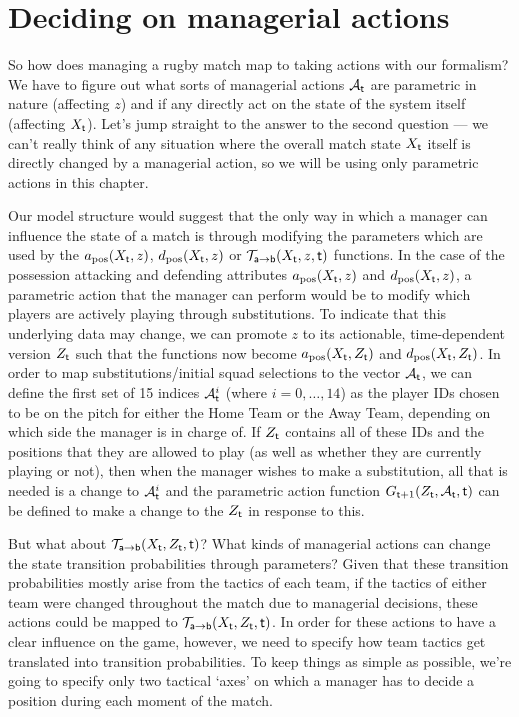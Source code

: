 \section{\sffamily Deciding on managerial actions}

So how does managing a rugby match map to taking actions with our formalism? We have to figure out what sorts of managerial actions ${\cal A}_{{\sf t}}$ are parametric in nature (affecting $z$) and if any directly act on the state of the system itself (affecting $X_{\sf t}$). Let's jump straight to the answer to the second question --- we can't really think of any situation where the overall match state $X_{\sf t}$ itself is directly changed by a managerial action, so we will be using only parametric actions in this chapter.

Our model structure would suggest that the only way in which a manager can influence the state of a match is through modifying the parameters which are used by the $a_{\rm pos}(X_{\sf t},z)$, $d_{\rm pos}(X_{\sf t},z)$ or ${\cal T}_{{\sf a}\rightarrow {\sf b}}(X_{\sf t},z,{\sf t})$ functions. In the case of the possession attacking and defending attributes $a_{\rm pos}(X_{\sf t},z)$ and $d_{\rm pos}(X_{\sf t},z)$, a parametric action that the manager can perform would be to modify which players are actively playing through substitutions. To indicate that this underlying data may change, we can promote $z$ to its actionable, time-dependent version $Z_{{\sf t}}$ such that the functions now become $a_{\rm pos}(X_{\sf t},Z_{\sf t})$ and $d_{\rm pos}(X_{\sf t},Z_{\sf t})$. In order to map substitutions/initial squad selections to the vector ${\cal A}_{\sf t}$, we can define the first set of 15 indices ${\cal A}_{\sf t}^i$ (where $i=0,\dots , 14$) as the player IDs chosen to be on the pitch for either the {\sf Home Team} or the {\sf Away Team}, depending on which side the manager is in charge of. If $Z_{\sf t}$ contains all of these IDs and the positions that they are allowed to play (as well as whether they are currently playing or not), then when the manager wishes to make a substitution, all that is needed is a change to ${\cal A}_{\sf t}^i$ and the parametric action function $G_{{\sf t}+1}(Z_{\sf t},{\cal A}_{\sf t},{\sf t})$ can be defined to make a change to the $Z_{\sf t}$ in response to this.

But what about ${\cal T}_{{\sf a}\rightarrow {\sf b}}(X_{\sf t},Z_{\sf t},{\sf t})$? What kinds of managerial actions can change the state transition probabilities through parameters? Given that these transition probabilities mostly arise from the tactics of each team, if the tactics of either team were changed throughout the match due to managerial decisions, these actions could be mapped to ${\cal T}_{{\sf a}\rightarrow {\sf b}}(X_{\sf t},Z_{\sf t},{\sf t})$. In order for these actions to have a clear influence on the game, however, we need to specify how team tactics get translated into transition probabilities. To keep things as simple as possible, we're going to specify only two tactical `axes' on which a manager has to decide a position during each moment of the match.

